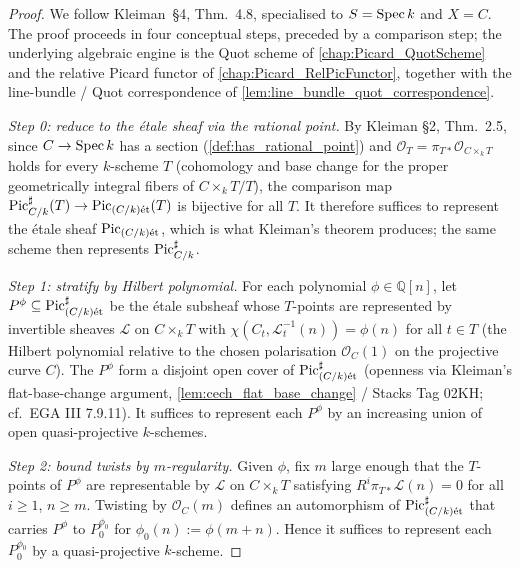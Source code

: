 \begin{proof}
  
  We follow Kleiman~\S 4, Thm.~4.8, specialised to \(S = \operatorname{Spec} k\) and
  \(X = C\). The proof proceeds in four conceptual steps, preceded by a
  comparison step; the underlying algebraic engine is the Quot scheme of
  \cref{chap:Picard_QuotScheme} and the relative Picard functor of
  \cref{chap:Picard_RelPicFunctor}, together with the line-bundle / Quot
  correspondence of \cref{lem:line_bundle_quot_correspondence}.

  \emph{Step 0: reduce to the \'etale sheaf via the rational point.}
  By Kleiman \S 2, Thm.~2.5, since \(C \to \operatorname{Spec} k\) has a section
  (\cref{def:has_rational_point}) and \(\mathcal O_T = \pi_{T*}
  \mathcal O_{C \times_k T}\) holds for every \(k\)-scheme \(T\) (cohomology
  and base change for the proper geometrically integral fibers of
  \(C\times_k T/T\)), the comparison map
  \(\operatorname{Pic}^\sharp_{C/k}(T) \to \operatorname{Pic}_{(C/k)\mathrm{\acute{e}t}}(T)\) is bijective for all
  \(T\). It therefore suffices to represent the \'etale sheaf
  \(\operatorname{Pic}_{(C/k)\mathrm{\acute{e}t}}\), which is what Kleiman's theorem produces; the same
  scheme then represents \(\operatorname{Pic}^\sharp_{C/k}\).

  \emph{Step 1: stratify by Hilbert polynomial.}
  For each polynomial \(\phi \in \mathbb{Q}[n]\), let \(P^\phi \subseteq
  \operatorname{Pic}^\sharp_{(C/k)\mathrm{\acute{e}t}}\) be the \'etale subsheaf whose \(T\)-points are
  represented by invertible sheaves \(\mathcal{L}\) on \(C \times_k T\) with
  \(\chi(C_t, \mathcal{L}_t^{-1}(n)) = \phi(n)\) for all \(t \in T\) (the
  Hilbert polynomial relative to the chosen polarisation
  \(\mathcal{O}_C(1)\) on the projective curve \(C\)). The \(P^\phi\) form a
  disjoint open cover of \(\operatorname{Pic}^\sharp_{(C/k)\mathrm{\acute{e}t}}\) (openness via Kleiman's
  flat-base-change argument, \cref{lem:cech_flat_base_change} / Stacks Tag 02KH;
  cf.\ EGA III 7.9.11). It suffices to
  represent each \(P^\phi\) by an increasing union of open quasi-projective
  \(k\)-schemes.

  \emph{Step 2: bound twists by \(m\)-regularity.}
  Given \(\phi\), fix \(m\) large enough that the \(T\)-points of \(P^\phi\) are
  representable by \(\mathcal{L}\) on \(C \times_k T\) satisfying
  \(R^i \pi_{T*} \mathcal{L}(n) = 0\) for all \(i \ge 1\), \(n \ge m\). Twisting
  by \(\mathcal{O}_C(m)\) defines an automorphism of \(\operatorname{Pic}^\sharp_{(C/k)\mathrm{\acute{e}t}}\)
  that carries \(P^\phi\) to \(P^{\phi_0}_0\) for \(\phi_0(n) := \phi(m + n)\).
  Hence it suffices to represent each \(P^{\phi_0}_0\) by a quasi-projective
  \(k\)-scheme.


\end{proof}
